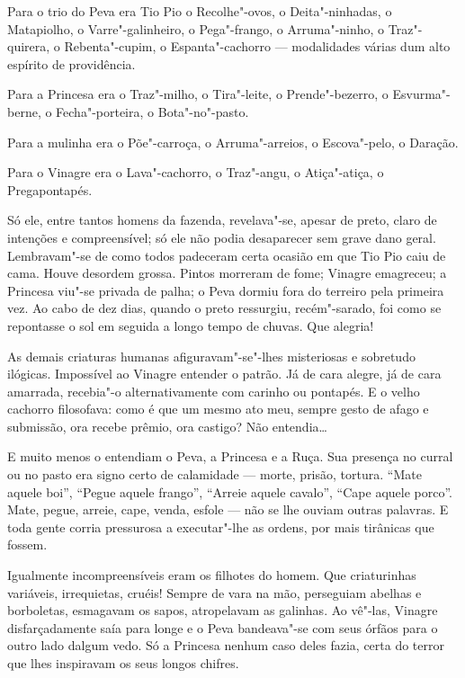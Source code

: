 Para o trio do Peva era Tio Pio o Recolhe"-ovos, o Deita"-ninhadas, o
Matapiolho, o Varre"-galinheiro, o Pega"-frango, o Arruma"-ninho, o
Traz"-quirera, o Rebenta"-cupim, o Espanta"-cachorro --- modalidades várias
dum alto espírito de providência.

Para a Princesa era o Traz"-milho, o Tira"-leite, o Prende"-bezerro, o
Esvurma"-berne, o Fecha"-porteira, o Bota"-no"-pasto.

Para a mulinha era o Põe"-carroça, o Arruma"-arreios, o Escova"-pelo, o
Daração.

Para o Vinagre era o Lava"-cachorro, o Traz"-angu, o Atiça"-atiça, o
Pregapontapés.

Só ele, entre tantos homens da fazenda, revelava"-se, apesar de preto,
claro de intenções e compreensível; só ele não podia desaparecer sem
grave dano geral. Lembravam"-se de como todos padeceram certa ocasião em
que Tio Pio caiu de cama. Houve desordem grossa. Pintos morreram de
fome; Vinagre emagreceu; a Princesa viu"-se privada de palha; o Peva
dormiu fora do terreiro pela primeira vez. Ao cabo de dez dias, quando o
preto ressurgiu, recém"-sarado, foi como se repontasse o sol em seguida a
longo tempo de chuvas. Que alegria!

As demais criaturas humanas afiguravam"-se"-lhes misteriosas e sobretudo
ilógicas. Impossível ao Vinagre entender o patrão. Já de cara alegre, já
de cara amarrada, recebia"-o alternativamente com carinho ou pontapés. E
o velho cachorro filosofava: como é que um mesmo ato meu, sempre gesto
de afago e submissão, ora recebe prêmio, ora castigo? Não entendia\ldots{}

E muito menos o entendiam o Peva, a Princesa e a Ruça. Sua presença no
curral ou no pasto era signo certo de calamidade --- morte, prisão,
tortura. ``Mate aquele boi'', ``Pegue aquele frango'', ``Arreie aquele
cavalo'', ``Cape aquele porco''. Mate, pegue, arreie, cape, venda,
esfole --- não se lhe ouviam outras palavras. E toda gente corria
pressurosa a executar"-lhe as ordens, por mais tirânicas que fossem.

Igualmente incompreensíveis eram os filhotes do homem. Que criaturinhas
variáveis, irrequietas, cruéis! Sempre de vara na mão, perseguiam
abelhas e borboletas, esmagavam os sapos, atropelavam as galinhas. Ao
vê"-las, Vinagre disfarçadamente saía para longe e o Peva bandeava"-se com
seus órfãos para o outro lado dalgum vedo. Só a Princesa nenhum caso
deles fazia, certa do terror que lhes inspiravam os seus longos chifres.

